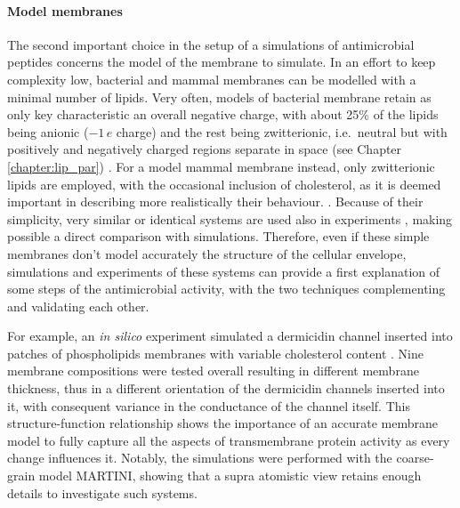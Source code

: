 \paragraph{Model membranes} The second important choice in the setup of a simulations of antimicrobial peptides concerns the model of the membrane to simulate. In an effort to keep complexity low, bacterial and mammal membranes can be modelled with a minimal number of lipids.
%
Very often, models of bacterial membrane retain as only key characteristic an overall negative charge, with about 25\% of the lipids being anionic ($-1\,e$ charge) and the rest being zwitterionic, i.e.\ neutral but with positively and negatively charged regions separate in space (see Chapter \ref{chapter:lip_par}) \citep{Lipkin2017,Wang2012,Zhao2018,Chen2019}.
For a model mammal membrane instead, only zwitterionic lipids are employed, with the occasional inclusion of cholesterol, as it is deemed important in describing more realistically their behaviour. \citep{Lipkin2017,Wang2012,Zhao2018,Chen2019,Risselada2008}.
Because of their simplicity, very similar or identical systems are used also in experiments \citep{Castelletto2016,Tang2009,Glukhov2005}, making possible a direct comparison with simulations.
Therefore, even if these simple membranes don't model accurately the structure of the cellular envelope, simulations and experiments of these systems can provide a first explanation of some steps of the antimicrobial activity, with the two techniques complementing and validating each other.

For example, an \emph{in silico} experiment simulated a dermicidin channel inserted into patches of phospholipids membranes with variable cholesterol content \citep{Song2019}. Nine membrane compositions were tested overall resulting in different membrane thickness, thus in a different orientation of the dermicidin channels inserted into it, with consequent variance in the conductance of the channel itself. This structure-function relationship shows the importance of an accurate membrane model to fully capture all the aspects of transmembrane protein activity as every change influences it. Notably, the simulations were performed with the coarse-grain model MARTINI, showing that a supra atomistic view retains enough details to investigate such systems.

